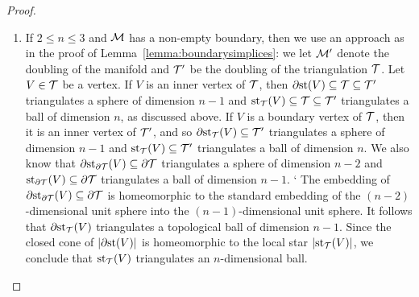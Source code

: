 \documentclass[10pt,letterpaper]{article}
\begin{document}
\begin{proof}
\begin{enumerate}
    \item 
    If $2 \leq n \leq 3$ and ${\mathcal M}$ has a non-empty boundary, then we use an approach as in the proof of Lemma~\ref{lemma:boundarysimplices}: 
    we let ${\mathcal M}'$ denote the doubling of the manifold and ${\mathcal T}'$ be the doubling of the triangulation ${\mathcal T}$. 
    Let $V \in {\mathcal T}$ be a vertex. 
    If $V$ is an inner vertex of ${\mathcal T}$, then ${\partial \rm st}(V) \subseteq {\mathcal T} \subseteq {\mathcal T}'$ triangulates a sphere of dimension $n-1$ and $\operatorname{st}_{{\mathcal T}}(V) \subseteq {\mathcal T} \subseteq {\mathcal T}'$ triangulates a ball of dimension $n$, as discussed above. 
    If $V$ is a boundary vertex of ${\mathcal T}$, then it is an inner vertex of ${\mathcal T}'$,
    and so ${\partial \rm st}_{{\mathcal T}}(V) \subseteq {\mathcal T}'$ triangulates a sphere of dimension $n-1$ and $\operatorname{st}_{{\mathcal T}}(V) \subseteq {\mathcal T}'$ triangulates a ball of dimension $n$.
    We also know that ${\partial \rm st}_{\partial{\mathcal T}}(V) \subseteq \partial{\mathcal T}$ triangulates a sphere of dimension $n-2$ and $\operatorname{st}_{\partial{\mathcal T}}(V) \subseteq \partial{\mathcal T}$ triangulates a ball of dimension $n-1$. `
    The embedding of ${\partial \rm st}_{\partial{\mathcal T}}(V) \subseteq \partial{\mathcal T}$ is homeomorphic to the standard embedding of the $(n-2)$-dimensional unit sphere into the $(n-1)$-dimensional unit sphere. 
    It follows that ${\partial \rm st}_{{\mathcal T}}(V)$ triangulates a topological ball of dimension $n-1$.
    Since the closed cone of $\left| {\partial \rm st}(V) \right|$ is homeomorphic to the local star $\left| \operatorname{st}_{{\mathcal T}}(V) \right|$, we conclude that $\operatorname{st}_{{\mathcal T}}(V)$ triangulates an $n$-dimensional ball. 
    

\end{enumerate}
\end{proof}
\end{document}

